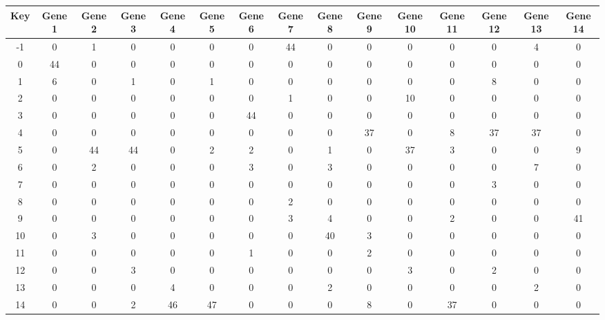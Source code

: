 \begin{tabular}{|c|c|c|c|c|c|c|c|c|c|c|c|c|c|c|}
\hline
Key & Gene 1 & Gene 2 & Gene 3 & Gene 4 & Gene 5 & Gene 6 & Gene 7 & Gene 8 & Gene 9 & Gene 10 & Gene 11 & Gene 12 & Gene 13 & Gene 14 \\
\hline
-1 & 0 & 1 & 0 & 0 & 0 & 0 & 44 & 0 & 0 & 0 & 0 & 0 & 4 & 0 \\
0 & 44 & 0 & 0 & 0 & 0 & 0 & 0 & 0 & 0 & 0 & 0 & 0 & 0 & 0 \\
1 & 6 & 0 & 1 & 0 & 1 & 0 & 0 & 0 & 0 & 0 & 0 & 8 & 0 & 0 \\
2 & 0 & 0 & 0 & 0 & 0 & 0 & 1 & 0 & 0 & 10 & 0 & 0 & 0 & 0 \\
3 & 0 & 0 & 0 & 0 & 0 & 44 & 0 & 0 & 0 & 0 & 0 & 0 & 0 & 0 \\
4 & 0 & 0 & 0 & 0 & 0 & 0 & 0 & 0 & 37 & 0 & 8 & 37 & 37 & 0 \\
5 & 0 & 44 & 44 & 0 & 2 & 2 & 0 & 1 & 0 & 37 & 3 & 0 & 0 & 9 \\
6 & 0 & 2 & 0 & 0 & 0 & 3 & 0 & 3 & 0 & 0 & 0 & 0 & 7 & 0 \\
7 & 0 & 0 & 0 & 0 & 0 & 0 & 0 & 0 & 0 & 0 & 0 & 3 & 0 & 0 \\
8 & 0 & 0 & 0 & 0 & 0 & 0 & 2 & 0 & 0 & 0 & 0 & 0 & 0 & 0 \\
9 & 0 & 0 & 0 & 0 & 0 & 0 & 3 & 4 & 0 & 0 & 2 & 0 & 0 & 41 \\
10 & 0 & 3 & 0 & 0 & 0 & 0 & 0 & 40 & 3 & 0 & 0 & 0 & 0 & 0 \\
11 & 0 & 0 & 0 & 0 & 0 & 1 & 0 & 0 & 2 & 0 & 0 & 0 & 0 & 0 \\
12 & 0 & 0 & 3 & 0 & 0 & 0 & 0 & 0 & 0 & 3 & 0 & 2 & 0 & 0 \\
13 & 0 & 0 & 0 & 4 & 0 & 0 & 0 & 2 & 0 & 0 & 0 & 0 & 2 & 0 \\
14 & 0 & 0 & 2 & 46 & 47 & 0 & 0 & 0 & 8 & 0 & 37 & 0 & 0 & 0 \\
\hline
\end{tabular}